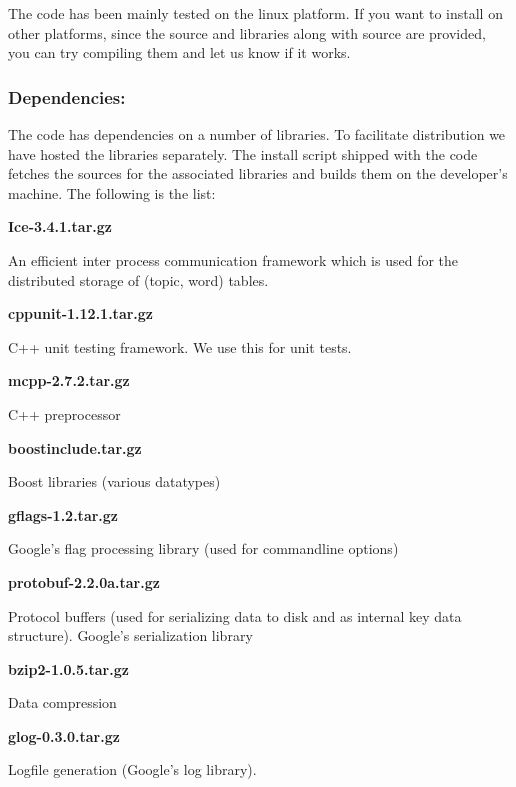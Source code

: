 The code has been mainly tested on the linux platform. If you want to install on other platforms, since the source and libraries along with source are provided, you can try compiling them and let us know if it works. \subsubsection*{Dependencies:}

The code has dependencies on a number of libraries. To facilitate distribution we have hosted the libraries separately. The install script shipped with the code fetches the sources for the associated libraries and builds them on the developer's machine. The following is the list: \par
 
\begin{DoxyEnumerate}
\item 

{\bfseries Ice-\/3.4.1.tar.gz }\par
 An efficient inter process communication framework which is used for the distributed storage of (topic, word) tables. 
\item 

{\bfseries cppunit-\/1.12.1.tar.gz }\par
 C++ unit testing framework. We use this for unit tests. 
\item 

{\bfseries mcpp-\/2.7.2.tar.gz }\par
 C++ preprocessor 
\item 

{\bfseries boostinclude.tar.gz }\par
 Boost libraries (various datatypes) 
\item 

{\bfseries gflags-\/1.2.tar.gz }\par
 Google's flag processing library (used for commandline options) 
\item 

{\bfseries protobuf-\/2.2.0a.tar.gz }\par
 Protocol buffers (used for serializing data to disk and as internal key data structure). Google's serialization library 
\item 

{\bfseries bzip2-\/1.0.5.tar.gz }\par
 Data compression 
\item 

{\bfseries glog-\/0.3.0.tar.gz }\par
 Logfile generation (Google's log library). 
\item 


\end{DoxyEnumerate}
